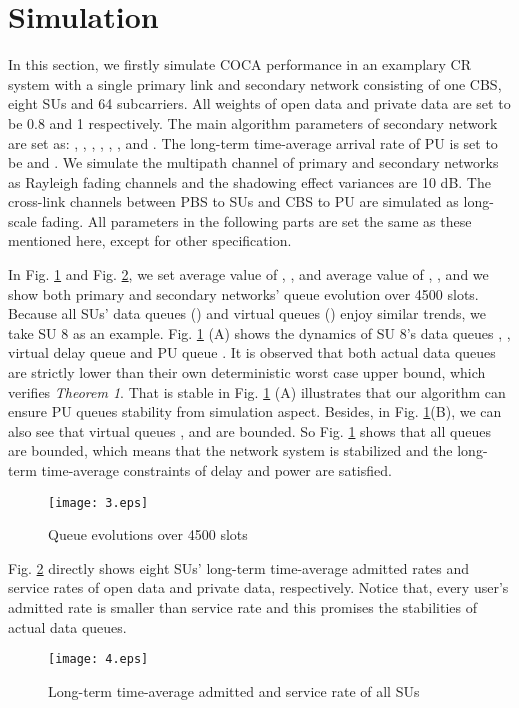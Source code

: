 \documentclass[journal]{IEEEtran}
\begin{document}
\section{Simulation}
In this section, we firstly simulate COCA performance in an examplary CR system with a single primary link and secondary
network consisting of one CBS, eight SUs and 64 subcarriers.  All weights of open data and private data
are set to be 0.8 and 1 respectively. The main algorithm parameters of secondary network are set as: ,
, , , , ,   and
.
The  long-term time-average  arrival rate of PU  is set to be  and . We simulate the multipath channel
of primary and secondary networks as Rayleigh fading channels and the shadowing effect variances are 10 dB. The cross-link
channels between PBS to SUs and CBS to PU are simulated as long-scale fading.
All parameters in the following parts are set the same as these mentioned here, except for other specification.



In Fig. \ref{queue_updates} and Fig. \ref{ad-ser}, we set average value of , ,
and average value of , ,  and we show both primary and secondary networks'
queue evolution over 4500 slots. Because all SUs' data queues () and virtual queues ()
enjoy  similar trends,  we take SU 8 as an example.  Fig. \ref{queue_updates} (A) shows the dynamics of SU 8's data queues
, , virtual delay queue  and PU queue . It is observed that both actual data queues are strictly
lower than their own deterministic worst case upper bound, which verifies \emph{Theorem 1}.  That  is stable
in Fig. \ref{queue_updates} (A) illustrates that our algorithm can ensure PU queues stability from simulation aspect. Besides, in Fig.
\ref{queue_updates}(B), we can also see that virtual queues ,  and  are bounded. So  Fig. \ref{queue_updates}
shows that all queues are bounded, which means that the network system is stabilized and the long-term time-average constraints of
delay and power are satisfied.

\begin{figure}
\centering
\texttt{[image: 3.eps]}
\caption{Queue evolutions over 4500 slots}
\label{queue_updates}
\end{figure}

Fig. \ref{ad-ser} directly shows eight SUs'  long-term time-average admitted rates and service rates of open data and private data,
respectively.  Notice that, every user's admitted rate is smaller than service rate and this promises the
stabilities of actual data queues.
\begin{figure}
\centering
\texttt{[image: 4.eps]}
\caption{Long-term time-average admitted and service rate of all SUs}
\label{ad-ser}
\end{figure}
\end{document}
